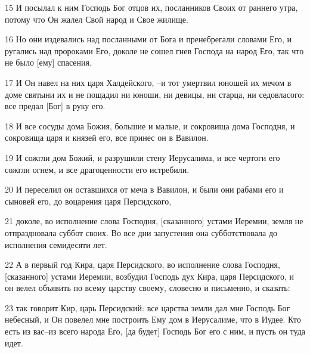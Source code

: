\par 15 И посылал к ним Господь Бог отцов их, посланников Своих от раннего утра, потому что Он жалел Свой народ и Свое жилище.
\par 16 Но они издевались над посланными от Бога и пренебрегали словами Его, и ругались над пророками Его, доколе не сошел гнев Господа на народ Его, так что не было [ему] спасения.
\par 17 И Он навел на них царя Халдейского, --и тот умертвил юношей их мечом в доме святыни их и не пощадил ни юноши, ни девицы, ни старца, ни седовласого: все предал [Бог] в руку его.
\par 18 И все сосуды дома Божия, большие и малые, и сокровища дома Господня, и сокровища царя и князей его, все принес он в Вавилон.
\par 19 И сожгли дом Божий, и разрушили стену Иерусалима, и все чертоги его сожгли огнем, и все драгоценности его истребили.
\par 20 И переселил он оставшихся от меча в Вавилон, и были они рабами его и сыновей его, до воцарения царя Персидского,
\par 21 доколе, во исполнение слова Господня, [сказанного] устами Иеремии, земля не отпраздновала суббот своих. Во все дни запустения она субботствовала до исполнения семидесяти лет.
\par 22 А в первый год Кира, царя Персидского, во исполнение слова Господня, [сказанного] устами Иеремии, возбудил Господь дух Кира, царя Персидского, и он велел объявить по всему царству своему, словесно и письменно, и сказать:
\par 23 так говорит Кир, царь Персидский: все царства земли дал мне Господь Бог небесный, и Он повелел мне построить Ему дом в Иерусалиме, что в Иудее. Кто есть из вас--из всего народа Его, [да будет] Господь Бог его с ним, и пусть он туда идет.


